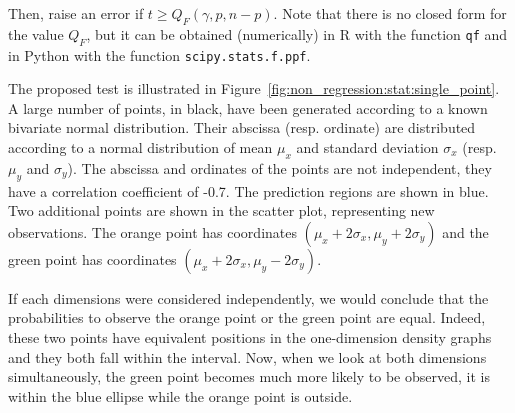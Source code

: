             Then, raise an error if \(t \geq Q_F(\gamma, p, n-p)\).  Note that there is no closed form for the value
            \(Q_F\), but it can be obtained (numerically) in R with the function
            \texttt{qf} and in Python
            with the function
            \texttt{scipy.stats.f.ppf}.

            The proposed test is illustrated in Figure~\ref{fig:non_regression:stat:single_point}. A large number of points,
            in black, have been generated according to a known bivariate normal distribution. Their abscissa (resp.
            ordinate) are distributed according to a normal distribution of mean \(\mu_x\) and standard deviation
            \(\sigma_x\) (resp. \(\mu_y\) and \(\sigma_y\)). The abscissa and ordinates of the points are not independent,
            they have a correlation coefficient of -0.7. The  prediction regions are shown in blue. Two
            additional points are shown in the scatter plot, representing new observations. The orange point has coordinates
            \((\mu_x+2\sigma_x,\mu_y+2\sigma_y)\) and the green point has coordinates \((\mu_x+2\sigma_x,\mu_y-2\sigma_y)\).

            If each dimensions were considered independently, we would conclude that the probabilities to observe the orange
            point or the green point are equal. Indeed, these two points have equivalent positions in the one-dimension
            density graphs and they both fall within the  interval. Now, when we look at both dimensions
            simultaneously, the green point becomes much more likely to be observed, it is within the blue ellipse while the
            orange point is outside.

